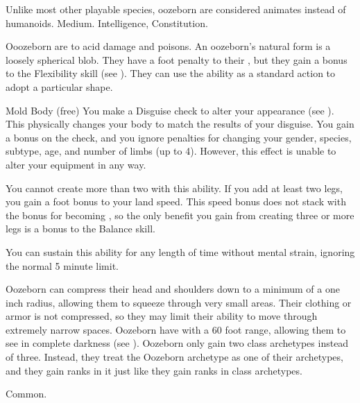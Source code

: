          Unlike most other playable species, oozeborn are considered animates instead of humanoids.
         Medium.
          Intelligence,  Constitution.
        \begin{itemize}
             Ooozeborn are  to acid damage and poisons.
             An oozeborn's natural form is a loosely spherical blob.
                They have a  foot penalty to their , but they gain a  bonus to the Flexibility skill (see ).
                They can use the  ability as a standard action to adopt a particular shape.
                \begin{sustainability}{Mold Body}{ (free)}
                    \rankline
                    You make a Disguise check to alter your appearance (see ).
                    This physically changes your body to match the results of your disguise.
                    You gain a  bonus on the check, and you ignore penalties for changing your gender, species, subtype, age, and number of limbs (up to 4).
                    However, this effect is unable to alter your equipment in any way.

                    You cannot create more than two  with this ability.
                    If you add at least two legs, you gain a  foot bonus to your land speed.
                    This speed bonus does not stack with the bonus for becoming , so the only benefit you gain from creating three or more legs is a  bonus to the Balance skill.

                    You can sustain this ability for any length of time without mental strain, ignoring the normal 5 minute limit.
                \end{sustainability}
             Oozeborn can compress their head and shoulders down to a minimum of a one inch radius, allowing them to squeeze through very small areas.
                Their clothing or armor is not compressed, so they may limit their ability to move through extremely narrow spaces.
             Oozeborn have  with a 60 foot range, allowing them to see in complete darkness (see ).
             Oozeborn only gain two class archetypes instead of three.
                Instead, they treat the Oozeborn archetype as one of their archetypes, and they gain ranks in it just like they gain ranks in class archetypes.
        \end{itemize}
         Common.
        
